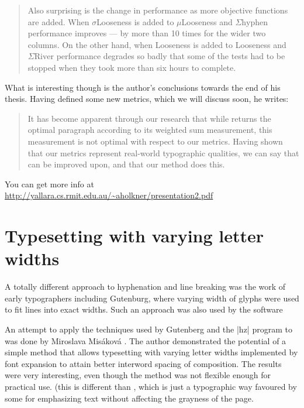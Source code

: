 {{\begin{quote}
Also surprising is the change in performance as more objective functions are added. When
$\sigma$Looseness is added to $\mu$Looseness and $\Sigma\text{hyphen}$ performance improves --- by more than 10 times
for the wider two columns. On the other hand, when Looseness is added to Looseness and $\Sigma\text{River}$
performance degrades so badly that some of the tests had to be stopped when they took more than six
hours to complete.

\end{quote}

What is interesting though is the author's conclusions towards the end of his thesis. Having defined some new metrics, which we will discuss soon, he writes:

\begin{quote}
It has become apparent through our research that while \tex returns the optimal paragraph according
to its weighted sum measurement, this measurement is not optimal with respect to our metrics.
Having shown that our metrics represent real-world typographic qualities, we can say that \tex can be
improved upon, and that our method does this.

\end{quote}

You can get more info at \url{http://yallara.cs.rmit.edu.au/~aholkner/presentation2.pdf}


\section{Typesetting with varying letter widths}
A totally different approach to hyphenation and line breaking was the work of early typographers including
Gutenburg, where varying width of glyphs were used to fit lines into exact widths. Such an approach was
also used by the  software\cite{hz}

An attempt to apply the techniques used by Gutenberg and the |hz| program to 
was done by Miroslava Mis\'akov\'a \cite{Miroslava1998}. The author demonstrated the potential of a simple
method that allows typesetting with varying letter widths implemented by font expansion
to attain better interword spacing of composition. The results were very interesting,
even though the method was not flexible enough for practical use. (this is different than , which
is just a typographic way favoured by some for emphasizing text without affecting the grayness of the page.

}}
